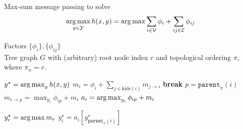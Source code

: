 \begin{algorithm} 
\caption[max-sum inference]{Max-sum message passing to solve 
$$\mathop{\arg\max}_{y \in \mathcal{Y}} h(x,y) = \mathop{\arg\max} \sum_{i \in \mathcal{V}} \phi_i + \sum_{ij \in \mathcal{E}} \phi_{ij}$$} 
\label{alg:max-inference} 
\begin{algorithmic} 

\REQUIRE $ $ \\ 
Factors $\{\phi_i\}, \{\phi_{ij}\}$\\
Tree graph $G$ with (arbitrary) root node index $r$ and topological ordering $\pi$, where $\pi_n = r$.

\ENSURE $y^\star = \mathop{\arg\max}_{y} h(x,y)$ 
\STATE
$m_i = \phi_i + \sum_{j \in \text{kids}(i)} m_{j \rightarrow i}$
 \STATE \textbf{break} \ENDIF
\STATE
$p = \texttt{parent}_\pi(i) $
\STATE
$m_{i \rightarrow p} = \max_{y_i} \phi_{ip} + m_i$
\STATE
$a_i = \mathop{\arg\max}_{y_i} \phi_{ip} + m_i$
\ENDFOR

\STATE
$y^\star_r = \mathop{\arg\max} m_r$
\STATE $y^\star_i = a_i\left[y^\star_{\texttt{parent}_\pi(i)}\right]$
\ENDFOR

\end{algorithmic} 
\end{algorithm}

